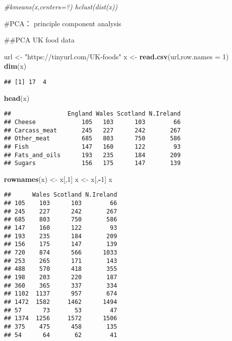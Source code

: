 \documentclass[
]{article}
\newenvironment{Shaded}{\begin{snugshade}}{\end{snugshade}}
\newcommand{\CommentTok}[1]{\textcolor[rgb]{0.56,0.35,0.01}{\textit{#1}}}
\newcommand{\DataTypeTok}[1]{\textcolor[rgb]{0.13,0.29,0.53}{#1}}
\newcommand{\DecValTok}[1]{\textcolor[rgb]{0.00,0.00,0.81}{#1}}
\newcommand{\KeywordTok}[1]{\textcolor[rgb]{0.13,0.29,0.53}{\textbf{#1}}}
\newcommand{\NormalTok}[1]{#1}
\newcommand{\OperatorTok}[1]{\textcolor[rgb]{0.81,0.36,0.00}{\textbf{#1}}}
\newcommand{\StringTok}[1]{\textcolor[rgb]{0.31,0.60,0.02}{#1}}
\begin{document}
\begin{Shaded}
\begin{Highlighting}[]
\CommentTok{#kmeans(x,centers=?)  hclust(dist(x))}
\end{Highlighting}
\end{Shaded}

\#PCA： principle component analysis

\#\#PCA UK food data

\begin{Shaded}
\begin{Highlighting}[]
\NormalTok{url <-}\StringTok{ "https://tinyurl.com/UK-foods"}
\NormalTok{x <-}\StringTok{ }\KeywordTok{read.csv}\NormalTok{(url,}\DataTypeTok{row.names =} \DecValTok{1}\NormalTok{)}
\KeywordTok{dim}\NormalTok{(x)}
\end{Highlighting}
\end{Shaded}

\begin{verbatim}
## [1] 17  4
\end{verbatim}

\begin{Shaded}
\begin{Highlighting}[]
\KeywordTok{head}\NormalTok{(x)}
\end{Highlighting}
\end{Shaded}

\begin{verbatim}
##                England Wales Scotland N.Ireland
## Cheese             105   103      103        66
## Carcass_meat       245   227      242       267
## Other_meat         685   803      750       586
## Fish               147   160      122        93
## Fats_and_oils      193   235      184       209
## Sugars             156   175      147       139
\end{verbatim}

\begin{Shaded}
\begin{Highlighting}[]
\KeywordTok{rownames}\NormalTok{(x) <-}\StringTok{ }\NormalTok{x[,}\DecValTok{1}\NormalTok{]}
\NormalTok{x <-}\StringTok{ }\NormalTok{x[,}\OperatorTok{-}\DecValTok{1}\NormalTok{]}
\NormalTok{x}
\end{Highlighting}
\end{Shaded}

\begin{verbatim}
##      Wales Scotland N.Ireland
## 105    103      103        66
## 245    227      242       267
## 685    803      750       586
## 147    160      122        93
## 193    235      184       209
## 156    175      147       139
## 720    874      566      1033
## 253    265      171       143
## 488    570      418       355
## 198    203      220       187
## 360    365      337       334
## 1102  1137      957       674
## 1472  1582     1462      1494
## 57      73       53        47
## 1374  1256     1572      1506
## 375    475      458       135
## 54      64       62        41
\end{verbatim}
\end{document}
